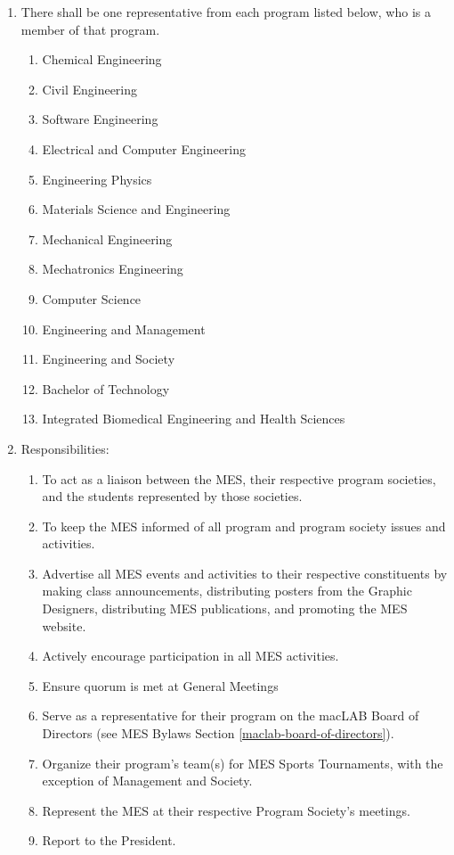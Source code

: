 \begin{enumerate}
 \item
  There shall be one representative from each program listed below, who is a member of that program.

  \begin{enumerate}
   \item
    Chemical Engineering
   \item
    Civil Engineering
   \item
    Software Engineering
   \item
    Electrical and Computer Engineering
   \item
    Engineering Physics
   \item
    Materials Science and Engineering
   \item
    Mechanical Engineering
   \item
    Mechatronics Engineering
   \item
    Computer Science
   \item
    Engineering and Management
   \item
    Engineering and Society
   \item
    Bachelor of Technology
   \item
    Integrated Biomedical Engineering and Health Sciences
  \end{enumerate}

 \item
  Responsibilities:

  \begin{enumerate}
   \item
    To act as a liaison between the MES, their respective program societies, and the students represented by those societies.
   \item
    To keep the MES informed of all program and program society issues and activities.
   \item
    Advertise all MES events and activities to their respective constituents by making class announcements, distributing posters from the Graphic Designers, distributing MES publications, and promoting the MES website.
   \item
    Actively encourage participation in all MES activities.
   \item
    Ensure quorum is met at General Meetings
   \item
    Serve as a representative for their program on the macLAB Board of Directors (see MES Bylaws Section \ref{maclab-board-of-directors}).
   \item
    Organize their program's team(s) for MES Sports Tournaments, with the exception of Management and Society.
   \item
    Represent the MES at their respective Program Society's meetings.
   \item
    Report to the President.
  \end{enumerate}

\end{enumerate}

